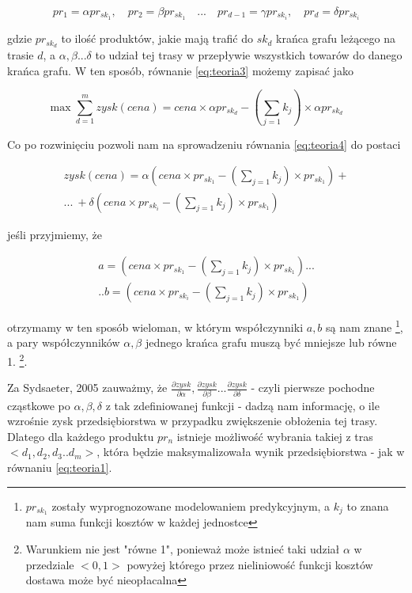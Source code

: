 \documentclass[polish, twoside, 12pt, a4paper]{article}
\theoremstyle{definition}
\theoremstyle{plain}
\theoremstyle{remark}
\begin{document}
\begin{equation*}
pr_1 = \alpha pr_{sk_1} , \quad pr_2 = \beta pr_{sk_1} \quad ... \quad  pr_{d-1} = \gamma pr_{sk_i} ,\quad  pr_d = \delta  pr_{sk_i}
\end{equation*}

gdzie $pr_{sk_d}$ to ilość produktów, jakie mają trafić do $sk_d$ krańca grafu leżącego na trasie $d$, a $\alpha,\beta...\delta$ to udział tej trasy w przepływie wszystkich towarów do danego krańca grafu. W ten sposób, równanie  \ref{eq:teoria3} możemy zapisać jako 

\begin{equation} \label{eq:teoria4}
\max \sum\limits_{d=1}^m  zysk(cena) = 
cena \times \alpha pr_{sk_d}-  ( \sum\limits_{j=1} k_j) \times \alpha pr_{sk_d} \qquad 
\end{equation}

Co po rozwinięciu pozwoli nam na sprowadzeniu równania \ref{eq:teoria4} do postaci

\begin{multline} \label{eq:teoria5}
zysk(cena) = \alpha(cena \times pr_{sk_1} - ( \sum\limits_{j=1} k_j) \times pr_{sk_1}) + \\
 ... \ + \delta(cena \times pr_{sk_i} - ( \sum\limits_{j=1} k_j) \times pr_{sk_1})
\end{multline}


jeśli przyjmiemy, że  

\begin{multline*}
a = (cena \times pr_{sk_1} - ( \sum\limits_{j=1} k_j) \times pr_{sk_1}) ... \\
.. b=(cena \times pr_{sk_i} - ( \sum\limits_{j=1} k_j) \times pr_{sk_1})
\end{multline*}

otrzymamy w ten sposób wieloman, w którym współczynniki $a,b$ są nam znane \footnote{$pr_{sk_1}$ zostały wyprognozowane modelowaniem predykcyjnym, a $k_j$ to znana nam suma funkcji kosztów w każdej jednostce}, a pary współczynników $\alpha, \beta$ jednego krańca grafu muszą być mniejsze lub równe 1. \footnote{Warunkiem nie jest "równe 1", ponieważ może istnieć taki udział $\alpha$ w przedziale $<0,1>$ powyżej którego przez nieliniowość funkcji kosztów dostawa może być nieopłacalna}. 

Za Sydsaeter, 2005 zauważmy, że $\frac{\partial zysk}{\partial \alpha} , \frac{\partial zysk}{\partial \beta} ... \frac{\partial zysk}{\partial \delta}$ - czyli pierwsze pochodne cząstkowe po $\alpha,\beta,\delta$ z tak zdefiniowanej funkcji - dadzą nam informację, o ile wzrośnie zysk przedsiębiorstwa w przypadku zwiększenie obłożenia tej trasy. Dlatego dla każdego produktu $pr_n$ istnieje możliwość wybrania takiej z tras $<d_1,d_2,d_3..d_m>$, która będzie maksymalizowała wynik przedsiębiorstwa - jak w równaniu \ref{eq:teoria1}. 
\end{document}
